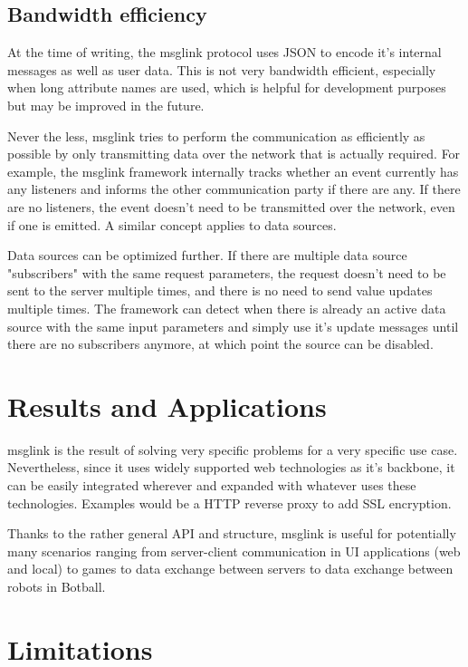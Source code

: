 \documentclass[conference]{IEEEtran}
\begin{document}
\subsection{Bandwidth efficiency}

At the time of writing, the msglink protocol uses JSON to encode it's internal messages as well as user data. This is not very bandwidth efficient, especially when long attribute names are used, which is helpful for development purposes but may be improved in the future. 

Never the less, msglink tries to perform the communication as efficiently as possible by only transmitting data over the network that is actually required. For example, the msglink framework internally tracks whether an event currently has any listeners and informs the other communication party if there are any. If there are no listeners, the event doesn't need to be transmitted over the network, even if one is emitted. A similar concept applies to data sources.

Data sources can be optimized further. If there are multiple data source "subscribers" with the same request parameters, the request doesn't need to be sent to the server multiple times, and there is no need to send value updates multiple times. The framework can detect when there is already an active data source with the same input parameters and simply use it's update messages until there are no subscribers anymore, at which point the source can be disabled.

\section{Results and Applications}

msglink is the result of solving very specific problems for a very specific use case. Nevertheless, since it uses widely supported web technologies as it's backbone, it can be easily integrated wherever and expanded with whatever uses these technologies. Examples would be a HTTP reverse proxy to add SSL encryption.  

Thanks to the rather general API and structure, msglink is useful for potentially many scenarios ranging from server-client communication in UI applications (web and local) to games to data exchange between servers to data exchange between robots in Botball.


\section{Limitations}
\end{document}
